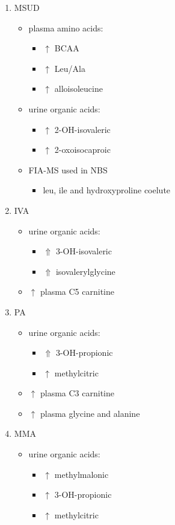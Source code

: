 \documentclass{scrartcl}
\begin{document}
\begin{enumerate}
\item MSUD
\label{sec:orgdda70da}
\begin{itemize}
\item plasma amino acids:
\begin{itemize}
\item \(\uparrow\) BCAA
\item \(\uparrow\) Leu/Ala
\item \(\uparrow\) alloisoleucine
\end{itemize}
\item urine organic acids:
\begin{itemize}
\item \(\uparrow\) 2-OH-isovaleric
\item \(\uparrow\) 2-oxoisocaproic
\end{itemize}
\item FIA-MS used in NBS
\begin{itemize}
\item leu, ile and hydroxyproline coelute
\end{itemize}
\end{itemize}
\item IVA
\label{sec:orge9b513b}
\begin{itemize}
\item urine organic acids:
\begin{itemize}
\item \(\Uparrow\) 3-OH-isovaleric
\item \(\Uparrow\) isovalerylglycine
\end{itemize}
\item \(\uparrow\) plasma C5 carnitine
\end{itemize}

\item PA
\label{sec:org632ff9e}
\begin{itemize}
\item urine organic acids:
\begin{itemize}
\item \(\Uparrow\) 3-OH-propionic
\item \(\uparrow\) methylcitric
\end{itemize}
\item \(\uparrow\) plasma C3 carnitine
\item \(\uparrow\) plasma glycine and alanine
\end{itemize}

\item MMA
\label{sec:org0bd06e2}
\begin{itemize}
\item urine organic acids:
\begin{itemize}
\item \(\uparrow\) methylmalonic
\item \(\uparrow\) 3-OH-propionic
\item \(\uparrow\) methylcitric
\end{itemize}


\end{itemize}
\end{enumerate}
\end{document}
